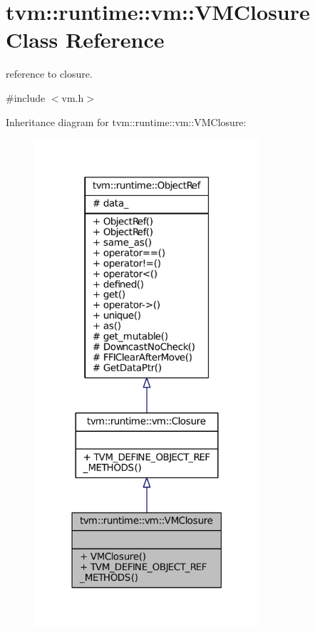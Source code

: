 \hypertarget{classtvm_1_1runtime_1_1vm_1_1VMClosure}{}\section{tvm\+:\+:runtime\+:\+:vm\+:\+:V\+M\+Closure Class Reference}
\label{classtvm_1_1runtime_1_1vm_1_1VMClosure}


reference to closure.  




{\ttfamily \#include $<$vm.\+h$>$}



Inheritance diagram for tvm\+:\+:runtime\+:\+:vm\+:\+:V\+M\+Closure\+:
\nopagebreak
\begin{figure}[H]
\begin{center}
\leavevmode
\includegraphics[width=237pt]{classtvm_1_1runtime_1_1vm_1_1VMClosure__inherit__graph}
\end{center}
\end{figure}


